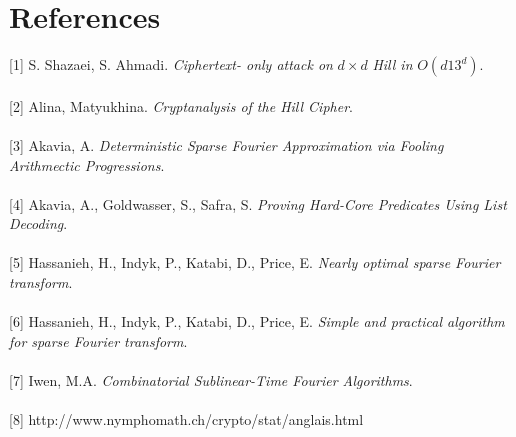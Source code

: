 \documentclass{article}
\begin{document}
\section*{References}

[1] S. Shazaei, S. Ahmadi. \textit{Ciphertext- only attack on} $d \times d$ \textit{Hill in} $O(d13^d)$.\\
\\[0pt]
[2] Alina, Matyukhina. \textit{Cryptanalysis of the Hill Cipher}.\\
\\[0pt]
[3] Akavia, A. \textit{Deterministic Sparse Fourier Approximation via Fooling Arithmectic Progressions}.\\
\\[0pt]
[4] Akavia, A., Goldwasser, S., Safra, S. \textit{Proving Hard-Core Predicates Using List Decoding}.\\
\\[0pt]
[5] Hassanieh, H., Indyk, P., Katabi, D., Price, E. \textit{Nearly optimal sparse Fourier transform}.\\
\\[0pt]
[6] Hassanieh, H., Indyk, P., Katabi, D., Price, E. \textit{Simple and practical algorithm for sparse Fourier transform}.\\
\\[0pt]
[7] Iwen, M.A. \textit{Combinatorial Sublinear-Time Fourier Algorithms}.\\
\\[0pt]
[8] http://www.nymphomath.ch/crypto/stat/anglais.html\\
\end{document}
